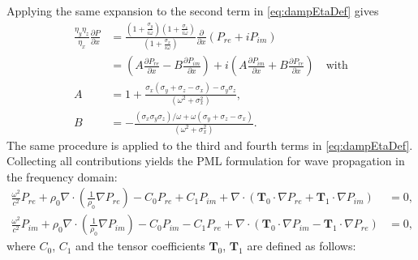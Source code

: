 \documentclass[final,num,12pt]{elsarticle}
\begin{document}
Applying the same expansion to the second term in \cref{eq:dampEtaDef} gives
 \begin{equation}
 \begin{aligned}
     \frac{\eta_y\eta_z}{\eta_x}\frac{\partial P}{\partial x} &= \frac{\left(1+\frac{\sigma_y}{i\omega}\right)\left(1+\frac{\sigma_z}{i\omega}\right)}{\left(1+\frac{\sigma_x}{i\omega}\right)}\frac{\partial}{\partial x}(P_{re} + iP_{im}) \\
     &= \left(A\frac{\partial P_{re}}{\partial x} - B\frac{\partial P_{im}}{\partial x}\right)
+ i\left(A\frac{\partial P_{im}}{\partial x} + B\frac{\partial P_{re}}{\partial x}\right) \quad \text{with} \\
A&=1 + \frac{\sigma_x(\sigma_y+\sigma_z -\sigma_x) - \sigma_y\sigma_z }{(\omega^2 + \sigma^2_x)} ,\\
B&= -\frac{(\sigma_x\sigma_y\sigma_z)/\omega + \omega(\sigma_y+\sigma_z-\sigma_x)}{(\omega^2 + \sigma^2_x)}.
    \end{aligned}
 \end{equation}
 The same procedure is applied to the third and fourth terms in \cref{eq:dampEtaDef}. Collecting all contributions yields the PML formulation for wave propagation in the frequency domain:
        \begin{equation*}
            \begin{aligned}
                \frac{\omega^2}{c^2} P_{re}  +  \rho_0 \nabla \cdot\left(\frac{1}{\rho_0} \nabla P_{re}\right) - C_0 P_{re} + C_1 P_{im}   
               + \nabla \cdot (\mathbf{T}_0 \cdot \nabla P_{re} + \mathbf{T}_1 \cdot \nabla P_{im}) &= 0, \\
            \frac{\omega^2}{c^2}P_{im} +  \rho_0 \nabla \cdot\left(\frac{1}{\rho_0} \nabla P_{im}\right)  - C_0 P_{im} - C_1 P_{re}
             + \nabla \cdot (\mathbf{T}_0 \cdot \nabla P_{im} - \mathbf{T}_1 \cdot \nabla P_{re}) &= 0, 
            \end{aligned}
            \label{eq:helmholtzPML}
        \end{equation*}
where $C_0$, $C_1$ and the tensor coefficients $\mathbf{T}_0$, $\mathbf{T}_1$ are defined as follows:
\end{document}
